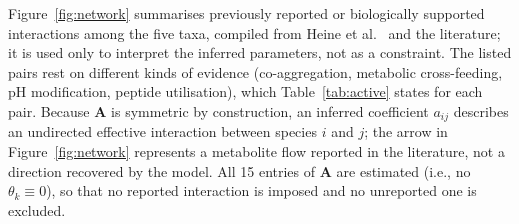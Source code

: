 \documentclass[pdflatex,sn-mathphys-num,lineno]{sn-jnl}
\begin{document}
Figure~\ref{fig:network} summarises previously reported or biologically supported interactions among the five taxa, compiled from Heine et al.~\cite{heine2025influence} and the literature; it is used only to interpret the inferred parameters, not as a constraint.
The listed pairs rest on different kinds of evidence (co-aggregation, metabolic cross-feeding, pH modification, peptide utilisation), which Table~\ref{tab:active} states for each pair.
Because $\mathbf{A}$ is symmetric by construction, an inferred coefficient $a_{ij}$ describes an undirected effective interaction between species $i$ and $j$; the arrow in Figure~\ref{fig:network} represents a metabolite flow reported in the literature, not a direction recovered by the model.
All 15 entries of $\mathbf{A}$ are estimated (i.e., no $\theta_k\equiv0$), so that no reported interaction is imposed and no unreported one is excluded.
\end{document}
